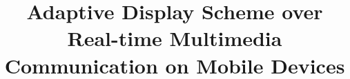 \documentclass[conference]{./IEEEtran}
\begin{document}
\title{Adaptive Display Scheme over Real-time Multimedia Communication on Mobile Devices}







\maketitle


















{
 \begin{footnotesize}
   
 \end{footnotesize}
}


%


\end{document}
